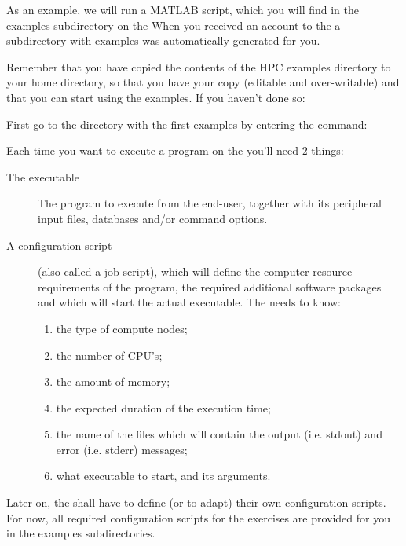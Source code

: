 As an example, we will run a MATLAB script, which you will find in the examples
subdirectory on the \hpc When you received an account to the \hpc a
subdirectory with examples was automatically generated for you.

Remember that you have copied the contents of the HPC examples directory to
your home directory, so that you have your copy (editable
and over-writable) and that you can start using the examples. If you haven't
done so:

\begin{prompt}
\end{prompt}

First go to the directory with the first examples by entering the command:

\begin{prompt}
\end{prompt}

Each time you want to execute a program on the \hpc you'll need 2 things:

\begin{description}
  \item[The executable] The program to execute from the end-user, together with its peripheral input files, databases and/or command options.
  \item[A configuration script] (also called a job-script), which will define the computer resource requirements of the program, the required additional software packages and which will start the actual executable.  The \hpc needs to know:
    \begin{enumerate}
      \item  the type of compute nodes;
      \item  the number of CPU's;
      \item  the amount of memory;
      \item  the expected duration of the execution time;
      \item  the name of the files which will contain the output (i.e. stdout) and error (i.e. stderr) messages;
      \item  what executable to start, and its arguments.
    \end{enumerate}
\end{description}

Later on, the \hpc shall have to define (or to adapt) their own
configuration scripts. For now, all required configuration scripts for the
exercises are provided for you in the examples subdirectories.

